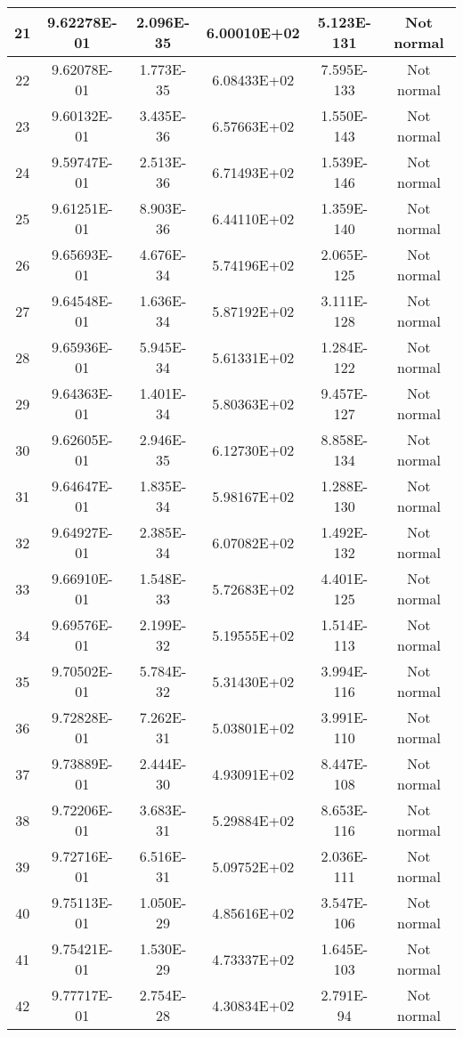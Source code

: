 \begin{table}[h]
\begin{tabular}{|c|c|c|c|c|c|}
		21 & 9.62278E-01 & 2.096E-35 & 6.00010E+02 & 5.123E-131 & Not normal\\\hline
		22 & 9.62078E-01 & 1.773E-35 & 6.08433E+02 & 7.595E-133 & Not normal\\\hline
		23 & 9.60132E-01 & 3.435E-36 & 6.57663E+02 & 1.550E-143 & Not normal\\\hline
		24 & 9.59747E-01 & 2.513E-36 & 6.71493E+02 & 1.539E-146 & Not normal\\\hline
		25 & 9.61251E-01 & 8.903E-36 & 6.44110E+02 & 1.359E-140 & Not normal\\\hline
		26 & 9.65693E-01 & 4.676E-34 & 5.74196E+02 & 2.065E-125 & Not normal\\\hline
		27 & 9.64548E-01 & 1.636E-34 & 5.87192E+02 & 3.111E-128 & Not normal\\\hline
		28 & 9.65936E-01 & 5.945E-34 & 5.61331E+02 & 1.284E-122 & Not normal\\\hline
		29 & 9.64363E-01 & 1.401E-34 & 5.80363E+02 & 9.457E-127 & Not normal\\\hline
		30 & 9.62605E-01 & 2.946E-35 & 6.12730E+02 & 8.858E-134 & Not normal\\\hline
		31 & 9.64647E-01 & 1.835E-34 & 5.98167E+02 & 1.288E-130 & Not normal\\\hline
		32 & 9.64927E-01 & 2.385E-34 & 6.07082E+02 & 1.492E-132 & Not normal\\\hline
		33 & 9.66910E-01 & 1.548E-33 & 5.72683E+02 & 4.401E-125 & Not normal\\\hline
		34 & 9.69576E-01 & 2.199E-32 & 5.19555E+02 & 1.514E-113 & Not normal\\\hline
		35 & 9.70502E-01 & 5.784E-32 & 5.31430E+02 & 3.994E-116 & Not normal\\\hline
		36 & 9.72828E-01 & 7.262E-31 & 5.03801E+02 & 3.991E-110 & Not normal\\\hline
		37 & 9.73889E-01 & 2.444E-30 & 4.93091E+02 & 8.447E-108 & Not normal\\\hline
		38 & 9.72206E-01 & 3.683E-31 & 5.29884E+02 & 8.653E-116 & Not normal\\\hline
		39 & 9.72716E-01 & 6.516E-31 & 5.09752E+02 & 2.036E-111 & Not normal\\\hline
		40 & 9.75113E-01 & 1.050E-29 & 4.85616E+02 & 3.547E-106 & Not normal\\\hline
		41 & 9.75421E-01 & 1.530E-29 & 4.73337E+02 & 1.645E-103 & Not normal\\\hline
		42 & 9.77717E-01 & 2.754E-28 & 4.30834E+02 & 2.791E-94 & Not normal\\\hline

\end{tabular}
\end{table}
